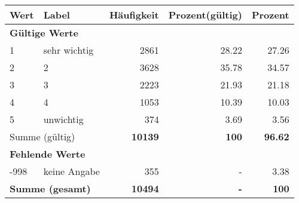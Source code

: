      \begin{longtable}{lXrrr}
     \toprule
     \textbf{Wert} & \textbf{Label} & \textbf{Häufigkeit} & \textbf{Prozent(gültig)} & \textbf{Prozent} \\
     \endhead
     \midrule
     \multicolumn{5}{l}{\textbf{Gültige Werte}}\\

     1 &
     \multicolumn{1}{X}{ sehr wichtig   } &


       \num{2861} &
       \num[round-mode=places,round-precision=2]{28,22} &
         \num[round-mode=places,round-precision=2]{27,26} \\

     2 &
     \multicolumn{1}{X}{ 2   } &


       \num{3628} &
       \num[round-mode=places,round-precision=2]{35,78} &
         \num[round-mode=places,round-precision=2]{34,57} \\

     3 &
     \multicolumn{1}{X}{ 3   } &


       \num{2223} &
       \num[round-mode=places,round-precision=2]{21,93} &
         \num[round-mode=places,round-precision=2]{21,18} \\

     4 &
     \multicolumn{1}{X}{ 4   } &


       \num{1053} &
       \num[round-mode=places,round-precision=2]{10,39} &
         \num[round-mode=places,round-precision=2]{10,03} \\

     5 &
     \multicolumn{1}{X}{ unwichtig   } &


       \num{374} &
       \num[round-mode=places,round-precision=2]{3,69} &
         \num[round-mode=places,round-precision=2]{3,56} \\
     \midrule
     \multicolumn{2}{l}{Summe (gültig)} &
       \textbf{\num{10139}} &
     \textbf{100} &
       \textbf{\num[round-mode=places,round-precision=2]{96,62}} \\
     \multicolumn{5}{l}{\textbf{Fehlende Werte}}\\
       -998 &
       keine Angabe &
         \num{355} &
        - &
         \num[round-mode=places,round-precision=2]{3,38} \\
     \midrule
     \multicolumn{2}{l}{\textbf{Summe (gesamt)}} &
          \textbf{\num{10494}} &
        \textbf{-} &
        \textbf{100} \\
     \bottomrule
     \end{longtable}
     
